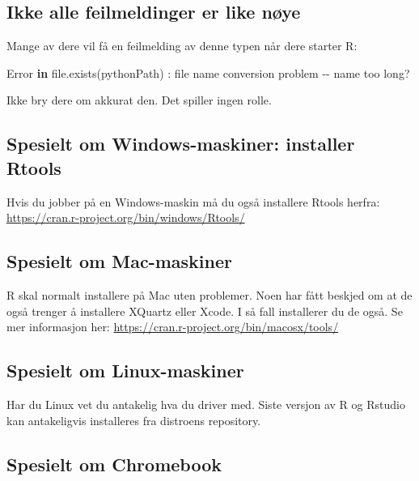 \documentclass[
  norsk,
  letterpaper,
  DIV=11,
  numbers=noendperiod]{scrreprt}
\newenvironment{Shaded}{\begin{snugshade}}{\end{snugshade}}
\newcommand{\ControlFlowTok}[1]{\textcolor[rgb]{0.00,0.23,0.31}{\textbf{#1}}}
\newcommand{\FunctionTok}[1]{\textcolor[rgb]{0.28,0.35,0.67}{#1}}
\newcommand{\NormalTok}[1]{\textcolor[rgb]{0.00,0.23,0.31}{#1}}
\newcommand{\SpecialCharTok}[1]{\textcolor[rgb]{0.37,0.37,0.37}{#1}}
\theoremstyle{definition}
\theoremstyle{remark}
\begin{document}
\subsection{Ikke alle feilmeldinger er like
nøye}\label{ikke-alle-feilmeldinger-er-like-nuxf8ye}

Mange av dere vil få en feilmelding av denne typen når dere starter R:

\begin{Shaded}
\begin{Highlighting}[]
\NormalTok{Error }\ControlFlowTok{in} \FunctionTok{file.exists}\NormalTok{(pythonPath) }\SpecialCharTok{:} 
\NormalTok{  file name conversion problem }\SpecialCharTok{{-}{-}}\NormalTok{ name too long?}
\end{Highlighting}
\end{Shaded}

Ikke bry dere om akkurat den. Det spiller ingen rolle.

\subsection{Spesielt om Windows-maskiner: installer
Rtools}\label{spesielt-om-windows-maskiner-installer-rtools}

Hvis du jobber på en Windows-maskin må du også installere Rtools herfra:
\url{https://cran.r-project.org/bin/windows/Rtools/}

\subsection{Spesielt om Mac-maskiner}\label{spesielt-om-mac-maskiner}

R skal normalt installere på Mac uten problemer. Noen har fått beskjed
om at de også trenger å installere XQuartz eller Xcode. I så fall
installerer du de også. Se mer informasjon her:
\url{https://cran.r-project.org/bin/macosx/tools/}

\subsection{Spesielt om
Linux-maskiner}\label{spesielt-om-linux-maskiner}

Har du Linux vet du antakelig hva du driver med. Siste versjon av R og
Rstudio kan antakeligvis installeres fra distroens repository.

\subsection{Spesielt om Chromebook}\label{spesielt-om-chromebook}
\end{document}
